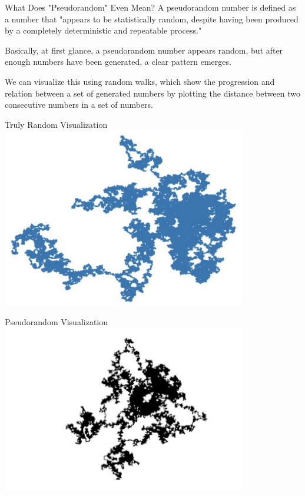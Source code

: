 \documentclass[aspectratio=169]{beamer}
\begin{document}
\begin{frame}{What Does "Pseudorandom" Even Mean?}
  A pseudorandom number is defined as a number that "appears to be statistically random, despite having been produced by a completely deterministic and repeatable process." \pause

  Basically, at first glance, a pseudorandom number appears random, but after enough numbers have been generated, a clear pattern emerges. \pause

  We can visualize this using random walks, which show the progression and relation between a set of generated numbers by plotting the distance between two consecutive numbers in a set of numbers.
\end{frame}

\begin{frame}{Truly Random Visualization}
\includegraphics[width=0.8\textwidth]{random.png}
\end{frame}

\begin{frame}{Pseudorandom Visualization}
\includegraphics[width=0.8\textwidth]{pseudorandom.png}
\end{frame}
\end{document}
